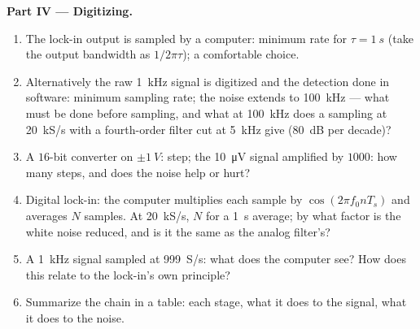\begin{problem}
\medskip
\noindent\textbf{Part IV --- Digitizing.}
\begin{enumerate}[resume]
  \item The lock-in output is sampled by a computer: minimum rate for
        $\tau = \qty{1}{s}$ (take the output bandwidth as $1/2\pi\tau$); a
        comfortable choice.
  \item Alternatively the raw \qty{1}{kHz} signal is digitized and the
        detection done in software: minimum sampling rate; the noise
        extends to \qty{100}{kHz} --- what must be done before sampling,
        and what  at \qty{100}{kHz} does a sampling at
        \qty{20}{kS/s} with a fourth-order filter cut at \qty{5}{kHz} give
        (\qty{80}{dB} per decade)?
  \item A $16$-bit converter on $\pm\qty{1}{V}$: step; the \qty{10}{\micro V}
        signal amplified by $1000$: how many steps, and does the noise
        help or hurt?
  \item Digital lock-in: the computer multiplies each sample by
        $\cos(2\pi f_0nT_s)$ and averages $N$ samples. At \qty{20}{kS/s},
        $N$ for a \qty{1}{s} average; by what factor is the white noise
        reduced, and is it the same as the analog filter's?
  \item A \qty{1}{kHz} signal sampled at \qty{999}{S/s}: what does the
        computer see? How does this relate to the lock-in's own
        principle?
  \item Summarize the chain in a table: each stage, what it does to the
        signal, what it does to the noise.
\end{enumerate}
\end{problem}
